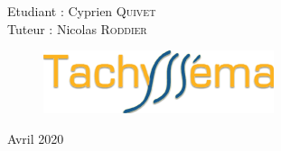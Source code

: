 \begin{titlepage}
  \Large
  Etudiant : Cyprien \textsc{Quivet}\\ %
  \Large
  Tuteur   : Nicolas  \textsc{Roddier}\\ %
  
  
  


  \begin{figure}[b]
    \centering
    \includegraphics{img/LogoTachyssema.png}\\[1cm] %
    \label{fig:LogoTachyssema}
  \end{figure}
  {\Large Avril 2020}\\[2cm] %

  
   
  
  \end{titlepage}